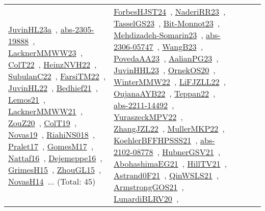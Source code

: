 {\begin{longtable}{lp{3cm}>{\raggedright\arraybackslash}p{6cm}>{\raggedright\arraybackslash}p{6cm}>{\raggedright\arraybackslash}p{8cm}}
\href{../works/JuvinHL23a.pdf}{JuvinHL23a}~\cite{JuvinHL23a}, \href{../works/abs-2305-19888.pdf}{abs-2305-19888}~\cite{abs-2305-19888}, \href{../works/LacknerMMWW23.pdf}{LacknerMMWW23}~\cite{LacknerMMWW23}, \href{../works/ColT22.pdf}{ColT22}~\cite{ColT22}, \href{../works/HeinzNVH22.pdf}{HeinzNVH22}~\cite{HeinzNVH22}, \href{../works/SubulanC22.pdf}{SubulanC22}~\cite{SubulanC22}, \href{../works/FarsiTM22.pdf}{FarsiTM22}~\cite{FarsiTM22}, \href{../works/JuvinHL22.pdf}{JuvinHL22}~\cite{JuvinHL22}, \href{../works/Bedhief21.pdf}{Bedhief21}~\cite{Bedhief21}, \href{../works/Lemos21.pdf}{Lemos21}~\cite{Lemos21}, \href{../works/LacknerMMWW21.pdf}{LacknerMMWW21}~\cite{LacknerMMWW21}, \href{../works/ZouZ20.pdf}{ZouZ20}~\cite{ZouZ20}, \href{../works/ColT19.pdf}{ColT19}~\cite{ColT19}, \href{../works/Novas19.pdf}{Novas19}~\cite{Novas19}, \href{../works/RiahiNS018.pdf}{RiahiNS018}~\cite{RiahiNS018}, \href{../works/Pralet17.pdf}{Pralet17}~\cite{Pralet17}, \href{../works/GomesM17.pdf}{GomesM17}~\cite{GomesM17}, \href{../works/Nattaf16.pdf}{Nattaf16}~\cite{Nattaf16}, \href{../works/Dejemeppe16.pdf}{Dejemeppe16}~\cite{Dejemeppe16}, \href{../works/GrimesH15.pdf}{GrimesH15}~\cite{GrimesH15}, \href{../works/ZhouGL15.pdf}{ZhouGL15}~\cite{ZhouGL15}, \href{../works/NovasH14.pdf}{NovasH14}~\cite{NovasH14}... (Total: 45) & \href{../works/ForbesHJST24.pdf}{ForbesHJST24}~\cite{ForbesHJST24}, \href{../works/NaderiRR23.pdf}{NaderiRR23}~\cite{NaderiRR23}, \href{../works/TasselGS23.pdf}{TasselGS23}~\cite{TasselGS23}, \href{../works/Bit-Monnot23.pdf}{Bit-Monnot23}~\cite{Bit-Monnot23}, \href{../works/Mehdizadeh-Somarin23.pdf}{Mehdizadeh-Somarin23}~\cite{Mehdizadeh-Somarin23}, \href{../works/abs-2306-05747.pdf}{abs-2306-05747}~\cite{abs-2306-05747}, \href{../works/WangB23.pdf}{WangB23}~\cite{WangB23}, \href{../works/PovedaAA23.pdf}{PovedaAA23}~\cite{PovedaAA23}, \href{../works/AalianPG23.pdf}{AalianPG23}~\cite{AalianPG23}, \href{../works/JuvinHHL23.pdf}{JuvinHHL23}~\cite{JuvinHHL23}, \href{../works/OrnekOS20.pdf}{OrnekOS20}~\cite{OrnekOS20}, \href{../works/WinterMMW22.pdf}{WinterMMW22}~\cite{WinterMMW22}, \href{../works/LiFJZLL22.pdf}{LiFJZLL22}~\cite{LiFJZLL22}, \href{../works/OujanaAYB22.pdf}{OujanaAYB22}~\cite{OujanaAYB22}, \href{../works/Teppan22.pdf}{Teppan22}~\cite{Teppan22}, \href{../works/abs-2211-14492.pdf}{abs-2211-14492}~\cite{abs-2211-14492}, \href{../works/YuraszeckMPV22.pdf}{YuraszeckMPV22}~\cite{YuraszeckMPV22}, \href{../works/ZhangJZL22.pdf}{ZhangJZL22}~\cite{ZhangJZL22}, \href{../works/MullerMKP22.pdf}{MullerMKP22}~\cite{MullerMKP22}, \href{../works/KoehlerBFFHPSSS21.pdf}{KoehlerBFFHPSSS21}~\cite{KoehlerBFFHPSSS21}, \href{../works/abs-2102-08778.pdf}{abs-2102-08778}~\cite{abs-2102-08778}, \href{../works/HubnerGSV21.pdf}{HubnerGSV21}~\cite{HubnerGSV21}, \href{../works/AbohashimaEG21.pdf}{AbohashimaEG21}~\cite{AbohashimaEG21}, \href{../works/HillTV21.pdf}{HillTV21}~\cite{HillTV21}, \href{../works/Astrand0F21.pdf}{Astrand0F21}~\cite{Astrand0F21}, \href{../works/QinWSLS21.pdf}{QinWSLS21}~\cite{QinWSLS21}, \href{../works/ArmstrongGOS21.pdf}{ArmstrongGOS21}~\cite{ArmstrongGOS21}, \href{../works/LunardiBLRV20.pdf}{LunardiBLRV20}~\cite{LunardiBLRV20}, 
\end{longtable}}
